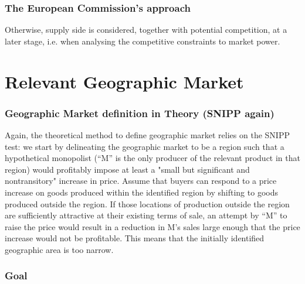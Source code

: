         \subsubsection{The European Commission's approach}


            Otherwise, supply side is considered, together with potential competition, at a later stage, i.e. when analysing the competitive constraints to market power.


\section{Relevant Geographic Market}

        \subsubsection{Geographic Market definition in Theory (SNIPP again)}

            Again, the theoretical method to define geographic market relies on the SNIPP test: we start by delineating the geographic market to be a region such that a hypothetical monopolist (“M” is the only producer of the relevant product in that region) would profitably impose at least a "small but significant and nontransitory" increase in price.
            Assume that buyers can respond to a price increase on goods produced within the identified region by shifting to goods produced outside the region. If those locations of production outside the region are sufficiently attractive at their existing terms of sale, an attempt by “M” to raise the price would result in a reduction in M’s sales large enough that the price increase would not be profitable. This means that the initially identified geographic area is too narrow.

        \subsubsection{Goal}

